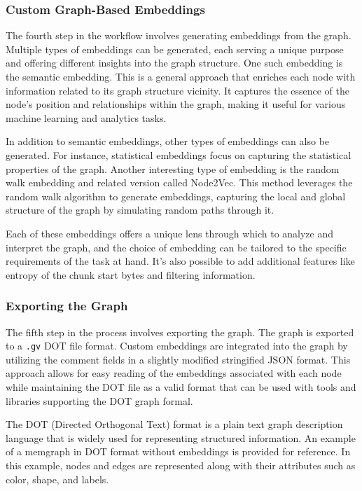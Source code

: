 \subsubsection{Custom Graph-Based Embeddings}

The fourth step in the workflow involves generating embeddings from the graph. Multiple types of embeddings can be generated, each serving a unique purpose and offering different insights into the graph structure. One such embedding is the semantic embedding. This is a general approach that enriches each node with information related to its graph structure vicinity. It captures the essence of the node's position and relationships within the graph, making it useful for various machine learning and analytics tasks.

In addition to semantic embeddings, other types of embeddings can also be generated. For instance, statistical embeddings focus on capturing the statistical properties of the graph. Another interesting type of embedding is the random walk embedding and related version called Node2Vec. This method leverages the random walk algorithm to generate embeddings, capturing the local and global structure of the graph by simulating random paths through it.

Each of these embeddings offers a unique lens through which to analyze and interpret the graph, and the choice of embedding can be tailored to the specific requirements of the task at hand. It's also possible to add additional features like entropy of the chunk start bytes and filtering information.

\subsubsection{Exporting the Graph}

The fifth step in the process involves exporting the graph. The graph is exported to a \texttt{.gv} DOT file format. Custom embeddings are integrated into the graph by utilizing the comment fields in a slightly modified stringified JSON format. This approach allows for easy reading of the embeddings associated with each node while maintaining the DOT file as a valid format that can be used with tools and libraries supporting the DOT graph formal.

The DOT (Directed Orthogonal Text) format is a plain text graph description language that is widely used for representing structured information. An example of a \gls{memgraph} in DOT format without embeddings is provided for reference. In this example, nodes and edges are represented along with their attributes such as color, shape, and labels.

